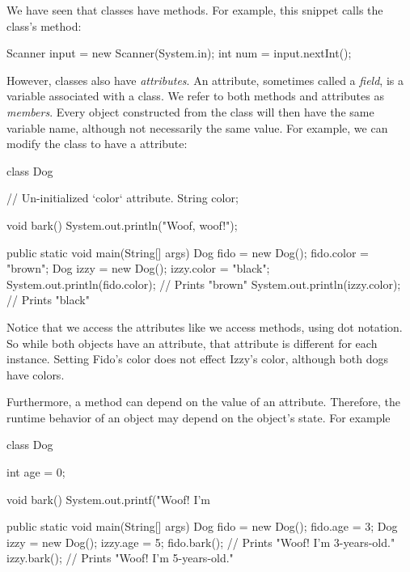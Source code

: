 We have seen that classes have methods. For example, this snippet calls the  class's  method:

\begin{code}
Scanner input = new Scanner(System.in);
int num = input.nextInt();
\end{code}

However, classes also have \emph{attributes}. An attribute, sometimes called a \emph{field}, is a variable associated with a class. We refer to both methods and attributes as \emph{members}. Every object constructed from the class will then have the same variable name, although not necessarily the same value. For example, we can modify the  class to have a  attribute:

\begin{code}
class Dog {

    // Un-initialized `color` attribute.
    String color;

    void bark() {
        System.out.println("Woof, woof!");
    }
    
    public static void main(String[] args) {
        Dog fido = new Dog();
        fido.color = "brown";
        Dog izzy = new Dog();
        izzy.color = "black";
        System.out.println(fido.color);  // Prints "brown"
        System.out.println(izzy.color);  // Prints "black"
    }
}
\end{code}

Notice that we access the attributes like we access methods, using dot notation. So while both  objects have an  attribute, that attribute is different for each instance. Setting Fido's color does not effect Izzy's color, although both dogs have colors.

Furthermore, a method can depend on the value of an attribute. Therefore, the runtime behavior of an object may depend on the object's state. For example

\begin{code}
class Dog {

    int age = 0;
    
    void bark() {
        System.out.printf("Woof! I'm %
    }
    
    public static void main(String[] args) {
        Dog fido = new Dog();
        fido.age = 3;
        Dog izzy = new Dog();
        izzy.age = 5;
        fido.bark();  // Prints "Woof! I'm 3-years-old."
        izzy.bark();  // Prints "Woof! I'm 5-years-old."
    }
}
\end{code}

